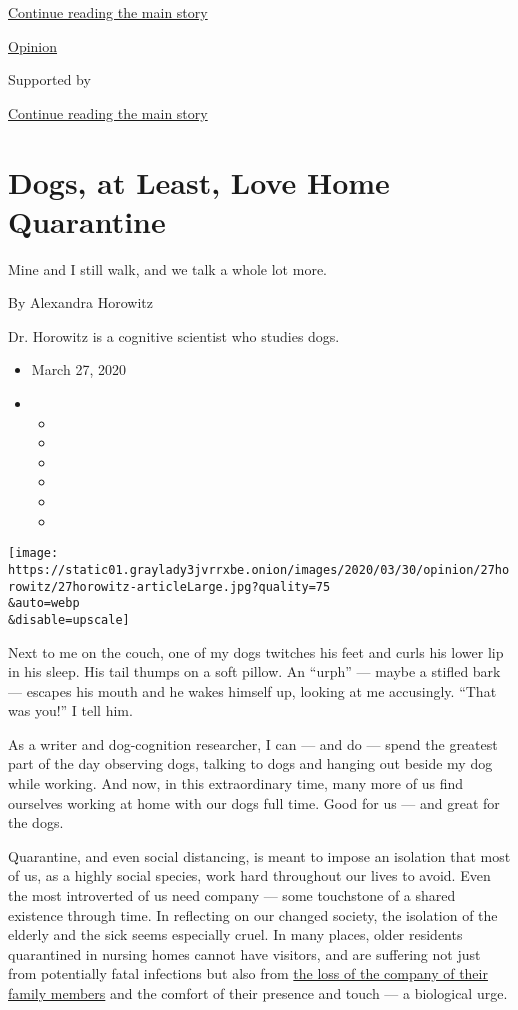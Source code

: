 \protect\hyperlink{after-top}{Continue reading the main story}

\href{/section/opinion}{Opinion}

Supported by

\protect\hyperlink{after-sponsor}{Continue reading the main story}

\hypertarget{dogs-at-least-love-home-quarantine}{%
\section{Dogs, at Least, Love Home
Quarantine}\label{dogs-at-least-love-home-quarantine}}

Mine and I still walk, and we talk a whole lot more.

By Alexandra Horowitz

Dr. Horowitz is a cognitive scientist who studies dogs.

\begin{itemize}
\item
  March 27, 2020
\item
  \begin{itemize}
  \item
  \item
  \item
  \item
  \item
  \item
  \end{itemize}
\end{itemize}

\texttt{[image: https://static01.graylady3jvrrxbe.onion/images/2020/03/30/opinion/27horowitz/27horowitz-articleLarge.jpg?quality=75\\\&auto=webp\\\&disable=upscale]}

Next to me on the couch, one of my dogs twitches his feet and curls his
lower lip in his sleep. His tail thumps on a soft pillow. An ``urph''
--- maybe a stifled bark --- escapes his mouth and he wakes himself up,
looking at me accusingly. ``That was you!'' I tell him.

As a writer and dog-cognition researcher, I can --- and do --- spend the
greatest part of the day observing dogs, talking to dogs and hanging out
beside my dog while working. And now, in this extraordinary time, many
more of us find ourselves working at home with our dogs full time. Good
for us --- and great for the dogs.

Quarantine, and even social distancing, is meant to impose an isolation
that most of us, as a highly social species, work hard throughout our
lives to avoid. Even the most introverted of us need company --- some
touchstone of a shared existence through time. In reflecting on our
changed society, the isolation of the elderly and the sick seems
especially cruel. In many places, older residents quarantined in nursing
homes cannot have visitors, and are suffering not just from potentially
fatal infections but also from
\href{https://www.npr.org/2020/03/07/813113958/opinion-1-unfathomable-toll-of-the-coronavirus-outbreak-dying-alone}{the
loss of the company of their family members} and the comfort of their
presence and touch --- a biological urge.

